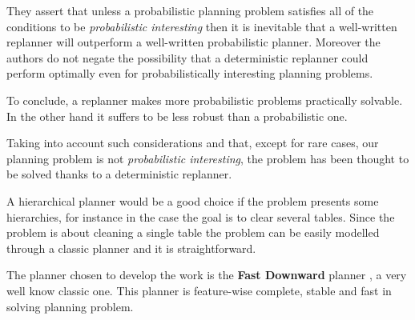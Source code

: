 They assert that unless a probabilistic planning problem satisfies all of the conditions to be \textit{probabilistic interesting} then it is inevitable that a well-written replanner will outperform a well-written probabilistic planner. Moreover the authors do not negate the possibility that a deterministic replanner could perform optimally even for probabilistically interesting planning problems. 

To conclude, a replanner makes more probabilistic problems practically solvable. In the other hand it suffers to be less robust than a probabilistic one. 

Taking into account such considerations and that, except for rare cases, our planning problem is not \textit{probabilistic interesting}, the problem has been thought to be solved thanks to a deterministic replanner.

A hierarchical planner would be a good choice if the problem presents some hierarchies, for instance in the case the goal is to clear several tables. Since the problem is about cleaning a single table the problem can be easily modelled through a classic planner and it is straightforward.

The planner chosen to develop the work is the \textbf{Fast Downward} planner \citep{helmert2006fast}, a very well know classic one. 
This planner is feature-wise complete, stable and fast in solving planning problem.

